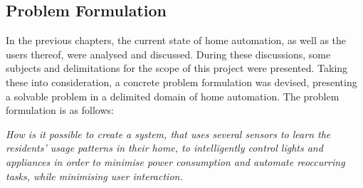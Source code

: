 \subsection{Problem Formulation}\label{problemFormulation}
In the previous chapters, the current state of home automation, as well as the users thereof, were analysed and discussed. During these discussions, some subjects and delimitations for the scope of this project were presented. Taking these into consideration, a concrete problem formulation was devised, presenting a solvable problem in a delimited domain of home automation. The problem formulation is as follows:

\emph{How is it possible to create a system, that uses several sensors to learn the residents’ usage patterns in their home, to intelligently control lights and appliances in order to minimise power consumption and automate reoccurring tasks, while minimising user interaction.}
